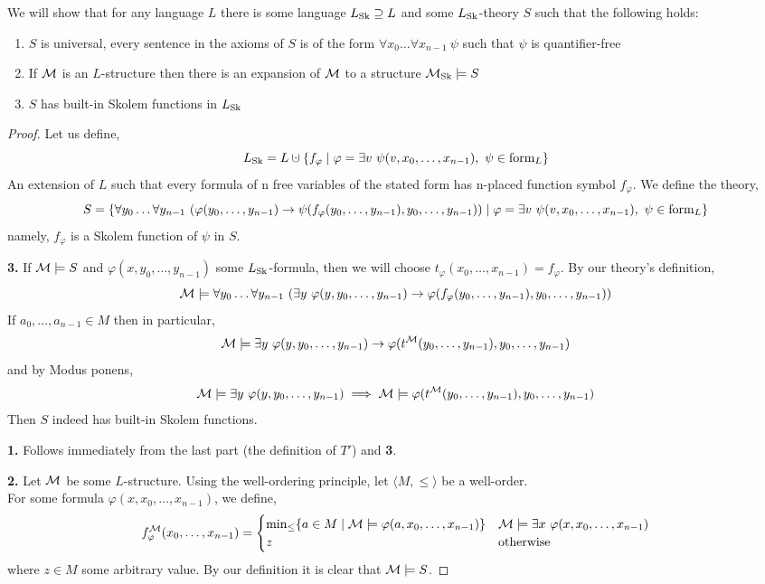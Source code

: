 \subquestion{}
We will show that for any language $L$ there is some language $L_{\operatorname{Sk}} \supseteq L$ and some $L_{\operatorname{Sk}}$-theory $S$ such that the following holds:
\begin{enumerate}
	\item $S$ is universal,
		every sentence in the axioms of $S$ is of the form $\forall x_0 \ldots \forall x_{n - 1}\ \psi$ such that $\psi$ is quantifier-free
	\item If $\mathcal{M}$ is an $L$-structure then there is an expansion of $\mathcal{M}$ to a structure $\mathcal{M}_{\operatorname{Sk}} \models S$
	\item $S$ has built-in Skolem functions in $L_{\operatorname{Sk}}$
\end{enumerate}
\begin{proof}
	Let us define,
	\[
		L_{\sk}
		= L \cupdot \{ f_{\varphi} \mid \varphi = \exists v\ \psi(v, x_0, \ldots, x_{n - 1}),\ \psi \in \form_L \}
	\]
	An extension of $L$ such that every formula of n free variables of the stated form has n-placed function symbol $f_{\varphi}$.
	We define the theory,
	\[
		S
		= \{ \forall y_0 \ldots \forall y_{n - 1}\ (\varphi(y_0, \ldots, y_{n - 1}) \to \psi(f_{\varphi}(y_0, \ldots, y_{n - 1}), y_0, \ldots, y_{n - 1}))
		\mid \varphi = \exists v\ \psi(v, x_0, \ldots, x_{n - 1}),\ \psi \in \operatorname{form}_L \}
	\]
	namely, $f_{\varphi}$ is a Skolem function of $\psi$ in $S$.

	\textbf{3.}
	If $\mathcal{M} \models S$ and $\varphi(x, y_0, \ldots, y_{n - 1})$ some $L_{\operatorname{Sk}}$-formula, then we will choose $t_{\varphi}(x_0, \ldots, x_{n - 1}) = f_{\varphi}$.
	By our theory's definition,
	\[
		\mathcal{M} \models \forall y_0 \ldots \forall y_{n - 1}\ (\exists y\ \varphi(y, y_0, \ldots, y_{n - 1}) \to \varphi(f_{\varphi}(y_0, \ldots, y_{n - 1}), y_0, \ldots, y_{n - 1}))
	\]
	If $a_0, \ldots, a_{n - 1} \in M$ then in particular,
	\[
		\Mm \models \exists y\ \varphi(y, y_0, \ldots, y_{n - 1}) \to \varphi(t^\Mm(y_0, \ldots, y_{n - 1}), y_0, \ldots, y_{n - 1})
	\]
	and by Modus ponens,
	\[
		\mathcal{M} \models \exists y\ \varphi(y, y_0, \ldots, y_{n - 1})
		\implies \mathcal{M} \models \varphi(t^{\mathcal{M}}(y_0, \ldots, y_{n - 1}), y_0, \ldots, y_{n - 1})
	\]
	Then $S$ indeed has built-in Skolem functions.

	\textbf{1.}
	Follows immediately from the last part (the definition of $T'$) and \textbf{3}.

	\textbf{2.}
	Let $\mathcal{M}$ be some $L$-structure.
	Using the well-ordering principle, let $\langle M, \le \rangle$ be a well-order. \\
	For some formula $\varphi(x, x_0, \ldots, x_{n - 1})$, we define,
	\[
		f_{\varphi}^{\mathcal{M}}(x_0, \ldots, x_{n - 1})
		= \begin{cases}
			\min_{\le} \{ a \in M \mid \mathcal{M} \models \varphi(a, x_0, \ldots, x_{n - 1}) \} & \mathcal{M} \models \exists x\ \varphi(x, x_0, \ldots, x_{n - 1}) \\
			z & \text{otherwise}
		\end{cases}
	\]
	where $z \in M$ some arbitrary value.
	By our definition it is clear that $\mathcal{M} \models S$.
\end{proof}

